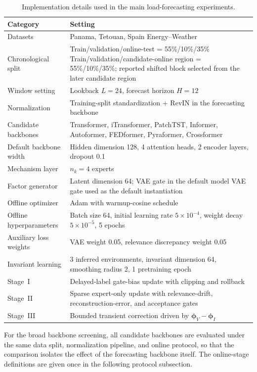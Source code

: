 ﻿\documentclass[journal]{IEEEtran}
\DeclareRobustCommand{\oldtext}[1]{{\color{revisionred}#1}}
\DeclareRobustCommand{\newtext}[1]{{\color{revisionblue}#1}}
\DeclareRobustCommand{\why}[1]{{\color{revisionblue}{\footnotesize (#1)}}}
\DeclareRobustCommand{\rw}[3]{\oldtext{#1} \newtext{#2}\why{#3}}
\begin{document}
\begin{table}[t]
\caption{Implementation details used in the main load-forecasting experiments.}
\label{tab:impl_details}
\centering
\begin{tabular}{lp{}}
\toprule
Category & Setting \\
\midrule
Datasets & Panama, Tetouan, Spain Energy--Weather \\
Chronological split & \rw{Train/validation/online-test = 55\%/10\%/35\%}{Train/validation/candidate-online region = 55\%/10\%/35\%; reported shifted block selected from the later candidate region}{修正表格中容易误导的 split 描述。} \\
Window setting & Lookback $L=24$, forecast horizon $H=12$ \\
Normalization & Training-split standardization + RevIN in the forecasting backbone \\
Candidate backbones & Transformer, iTransformer, PatchTST, Informer, Autoformer, FEDformer, Pyraformer, Crossformer \\
Default backbone width & Hidden dimension 128, 4 attention heads, 2 encoder layers, dropout 0.1 \\
Mechanism layer & $n_k=4$ experts \\
Factor generator & Latent dimension 64; \rw{VAE gate in the default model}{VAE gate used as the default instantiation}{避免把 VAE 写成已被消融证明的核心贡献。} \\
Offline optimizer & Adam with warmup-cosine schedule \\
Offline hyperparameters & Batch size 64, initial learning rate $5\times 10^{-4}$, weight decay $5\times 10^{-5}$, 5 epochs \\
Auxiliary loss weights & VAE weight 0.05, relevance discrepancy weight 0.05 \\
Invariant learning & 3 inferred environments, invariant dimension 64, smoothing radius 2, 1 pretraining epoch \\
Stage~I & Delayed-label gate-bias update with clipping and rollback \\
Stage~II & Sparse expert-only update with relevance-drift, reconstruction-error, and acceptance gates \\
Stage~III & Bounded transient correction driven by $\boldsymbol{\phi}_V-\boldsymbol{\phi}_I$ \\
\bottomrule
\end{tabular}
\end{table}

For the broad backbone screening, all candidate backbones are evaluated under the same data split, normalization pipeline, and online protocol, so that the comparison isolates the effect of the forecasting backbone itself. The online-stage definitions are given once in the following protocol subsection.
\end{document}
